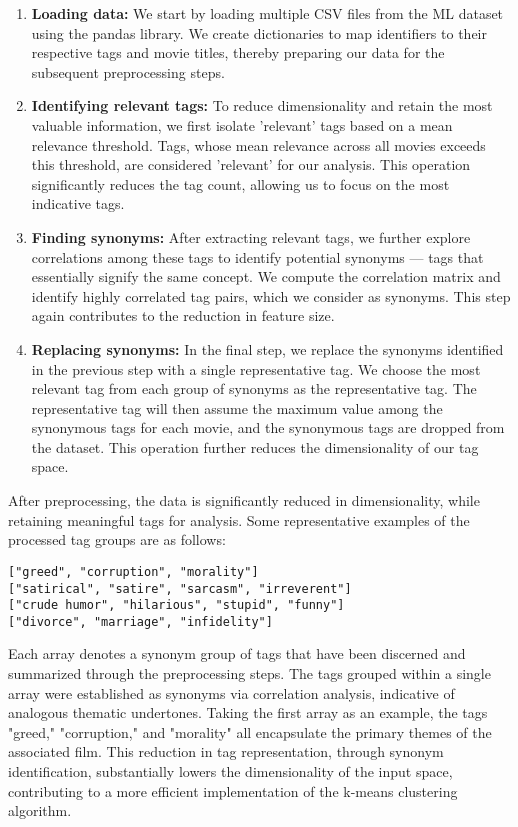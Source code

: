 \begin{enumerate}
    \item \textbf{Loading data:} We start by loading multiple CSV files from the ML dataset using the pandas library. We create dictionaries to map identifiers to their respective tags and movie titles, thereby preparing our data for the subsequent preprocessing steps.
    \item \textbf{Identifying relevant tags:} To reduce dimensionality and retain the most valuable information, we first isolate 'relevant' tags based on a mean relevance threshold. Tags, whose mean relevance across all movies exceeds this threshold, are considered 'relevant' for our analysis. This operation significantly reduces the tag count, allowing us to focus on the most indicative tags.
    \item \textbf{Finding synonyms:} After extracting relevant tags, we further explore correlations among these tags to identify potential synonyms — tags that essentially signify the same concept. We compute the correlation matrix and identify highly correlated tag pairs, which we consider as synonyms. This step again contributes to the reduction in feature size.
    \item \textbf{Replacing synonyms:} In the final step, we replace the synonyms identified in the previous step with a single representative tag. We choose the most relevant tag from each group of synonyms as the representative tag. The representative tag will then assume the maximum value among the synonymous tags for each movie, and the synonymous tags are dropped from the dataset. This operation further reduces the dimensionality of our tag space.
\end{enumerate}

After preprocessing, the data is significantly reduced in dimensionality, while retaining meaningful tags for analysis. Some representative examples of the processed tag groups are as follows:

\begin{small}
\begin{verbatim}
["greed", "corruption", "morality"]
["satirical", "satire", "sarcasm", "irreverent"]
["crude humor", "hilarious", "stupid", "funny"]
["divorce", "marriage", "infidelity"]
\end{verbatim}
\end{small}

Each array denotes a synonym group of tags that have been discerned and summarized through the preprocessing steps. The tags grouped within a single array were established as synonyms via correlation analysis, indicative of analogous thematic undertones. Taking the first array as an example, the tags "greed," "corruption," and "morality" all encapsulate the primary themes of the associated film. This reduction in tag representation, through synonym identification, substantially lowers the dimensionality of the input space, contributing to a more efficient implementation of the k-means clustering algorithm. 

